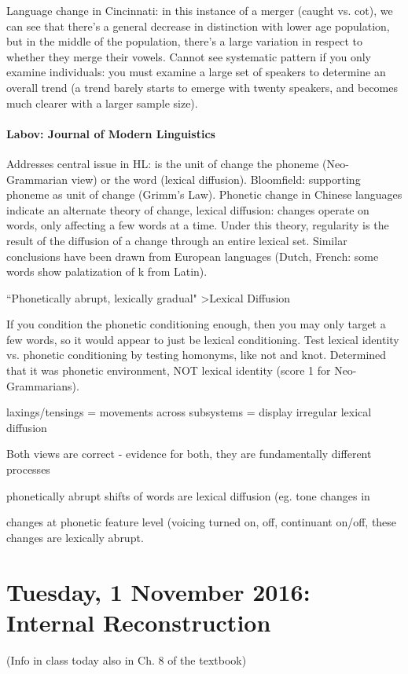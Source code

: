 \documentclass{exam}
\begin{document}
Language change in Cincinnati: in this instance of a merger (caught vs. cot), we can see that there's a general decrease in distinction with lower age population, but in the middle of the population, there's a large variation in respect to whether they merge their vowels. Cannot see systematic pattern if you only examine individuals: you must examine a large set of speakers to determine an overall trend (a trend barely starts to emerge with twenty speakers, and becomes much clearer with a larger sample size). 

\paragraph{Labov: Journal of Modern Linguistics} Addresses central issue in HL: is the unit of change the phoneme (Neo-Grammarian view) or the word (lexical diffusion). Bloomfield: supporting phoneme as unit of change (Grimm's Law). Phonetic change in Chinese languages indicate an alternate theory of change, lexical diffusion: changes operate on words, only affecting a few words at a time. Under this theory, regularity is the result of the diffusion of a change through an entire lexical set. Similar conclusions have been drawn from European languages (Dutch, French: some words show palatization of k from Latin).

``Phonetically abrupt, lexically gradual" >Lexical Diffusion

If you condition the phonetic conditioning enough, then you may only target a few words, so it would appear to just be lexical conditioning.  Test lexical identity vs. phonetic conditioning by testing homonyms, like not and knot. Determined that it was phonetic environment, NOT lexical identity (score 1 for Neo-Grammarians). 

laxings/tensings = movements across subsystems = display irregular lexical diffusion

Both views are correct - evidence for both, they are fundamentally different processes

phonetically abrupt shifts of words are lexical diffusion (eg. tone changes in 

changes at phonetic feature level (voicing turned on, off, continuant on/off, these changes are lexically abrupt. 

\section*{Tuesday, 1 November 2016: Internal Reconstruction}

(Info in class today also in Ch. 8 of the textbook)
\end{document}
